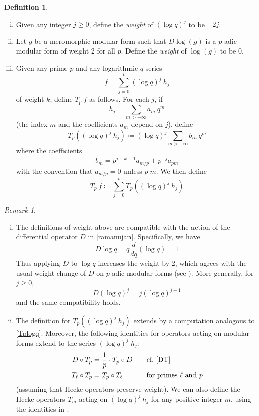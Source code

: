 \documentclass{gtpart}
\theoremstyle{definition}
\newtheorem{defn}[thm]{Definition}
\theoremstyle{remark}
\newtheorem{rmk}[thm]{Remark}
\newcommand{\ce}{\coloneqq}
\renewcommand{\=}{\approx}
\renewcommand{\-}{\sim}
\numberwithin{equation}{section}
\numberwithin{thm}{section}
\begin{document}
\begin{defn}
 \label{def:logq}
 \mbox{}
 \begin{enumerate}[(i)]
  \item Given any integer $j \geq 0$, define the {\em weight} of $(\log q)^j$ to be $-2 j$.  

  \item \label{ii} Let $g$ be a meromorphic modular form 
  such that $D \log(g)$ is a $p$-adic modular form of weight 2 for all $p$.  
  Define the {\em weight} of $\log(g)$ to be 0.  

  \item \label{iii} Given any prime $p$ and any logarithmic $q$-series 
  \[
   f = \sum_{j=0}^t (\log q)^j ~\! h_j 
  \]
  of weight $k$, define $T_p~f$ as follows.  
  For each $j$, if 
  \[
   h_j = \sum_{m > -\infty} a_m ~\! q^m 
  \]
  (the index $m$ and the coefficients $a_m$ depend on $j$), define 
  \[
   T_p \! \left( (\log q)^j ~\! h_j \right) \ce (\log q)^j \sum_{m > -\infty} b_m ~\! q^m 
  \]
  where the coefficients 
  \[
   b_m = p^{j + k - 1} a_{m/p} + p^{-j} a_{p m} 
  \]
  with the convention that $a_{m/p} = 0$ unless $p|m$.  
  We then define 
  \[
   T_p~f \ce \sum_{j=0}^t T_p \! \left( (\log q)^j ~\! h_j \right) 
  \]
 \end{enumerate}
\end{defn}
\begin{rmk}
 \mbox{}
 \begin{enumerate}[(i)]
  \item The definitions of weight above are compatible with the action of the differential operator $D$ in \eqref{ramanujan}.  
  Specifically, we have 
  \[
   D \log q = q \frac{d}{dq} (\log q) = 1 
  \]
  Thus applying $D$ to $\log q$ increases the weight by 2, 
  which agrees with the usual weight change of $D$ on $p$-adic modular forms (see \cite[Th\'eor\`eme 5(a)]{fmpadiq}).  
  More generally, for $j \geq 0$, 
  \[
   D (\log q)^j = j (\log q)^{j - 1} 
  \]
  and the same compatibility holds.  

  \item The definition for $T_p \! \left( (\log q)^j ~\! h_j \right)$ 
  extends \cite[Formula 1.11.1]{padicprop} by a computation analogous to \eqref{Tplogq}.  
  Moreover, the following identities for operators acting on modular forms extend to the series $(\log q)^j ~\! h_j$: 
  \begin{equation*}
   \begin{split}
         D \circ T_p = & ~ \frac{1}{p} \cdot T_p \circ D \qquad \text{cf.~\eqref{DT}} \\
    T_\ell \circ T_p = & ~ T_p \circ T_\ell \qquad\quad~ \text{for primes $\ell$ and $p$} 
   \end{split}
  \end{equation*}
  (assuming that Hecke operators preserve weight).  
  We can also define the Hecke operators $T_m$ acting on $(\log q)^j ~\! h_j$ 
  for any positive integer $m$, using the identities in \cite[Remarque after Th\'eor\`eme 4]{fmpadiq}.  
 \end{enumerate}
\end{rmk}
\end{document}
